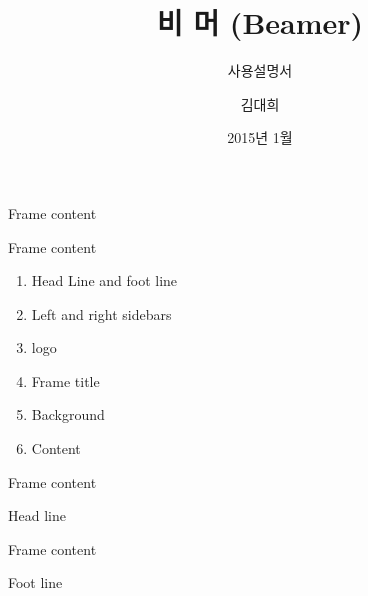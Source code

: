 \documentclass[10pt,xcolor=pdftex,dvipsnames,table,handout]{beamer}
\begin{document}
	

			\title{비 머 (Beamer)}
			\subtitle{사용설명서}
			\author{김대희}
			\date[2011.11.10]{2015년 1월}



		\begin{frame}[plain]
		\titlepage
		\end{frame}


		\begin{frame}{Frame content}

			\begin{block} {Frame content}
			\begin{enumerate}
			\item Head Line and foot line
			\item Left and right sidebars
			\item logo
			\item Frame title
			\item Background
			\item Content
			\end{enumerate}
			\end{block}

		\end{frame}


		\begin{frame}[t]{Frame content}

			\begin{block} {Head line}
			\end{block}

		\end{frame}

		\begin{frame}[t]{Frame content}

			\begin{block} {Foot line}
			\end{block}

		\end{frame}
\end{document}

